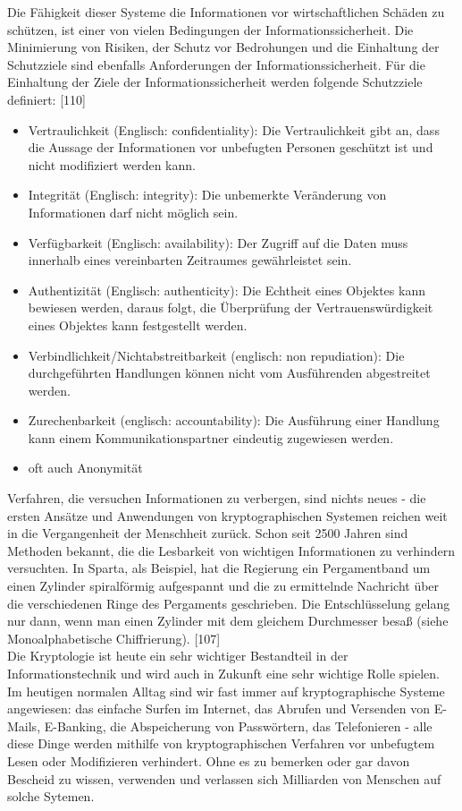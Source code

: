 \documentclass[12pt,a4paper]{report}
\begin{document}
\begin{onehalfspace}
Die Fähigkeit dieser Systeme die Informationen vor wirtschaftlichen Schäden zu schützen, ist einer von vielen Bedingungen der Informationssicherheit. Die Minimierung von Risiken, der Schutz vor Bedrohungen und die Einhaltung der Schutzziele sind ebenfalls Anforderungen der Informationssicherheit. Für die Einhaltung der Ziele der Informationssicherheit werden folgende Schutzziele definiert: [110]

\begin{itemize}
\item Vertraulichkeit (Englisch: confidentiality): Die Vertraulichkeit gibt an, dass die Aussage der Informationen vor unbefugten Personen geschützt ist und nicht modifiziert werden kann.
\item Integrität (Englisch: integrity): Die unbemerkte Veränderung von Informationen darf nicht möglich sein.
\item Verfügbarkeit (Englisch: availability): Der Zugriff auf die Daten muss innerhalb eines vereinbarten Zeitraumes gewährleistet sein.
\item Authentizität (Englisch: authenticity): Die Echtheit eines Objektes kann bewiesen werden, daraus folgt, die Überprüfung der Vertrauenswürdigkeit eines Objektes kann festgestellt werden.
\item Verbindlichkeit/Nichtabstreitbarkeit (englisch: non repudiation): Die durchgeführten Handlungen können nicht vom Ausführenden abgestreitet werden.
\item Zurechenbarkeit (englisch: accountability): Die Ausführung einer Handlung kann einem Kommunikationspartner eindeutig zugewiesen werden.
\item oft auch Anonymität
\end{itemize}

Verfahren, die versuchen Informationen zu verbergen, sind nichts neues - die ersten Ansätze und Anwendungen von kryptographischen Systemen reichen weit in die Vergangenheit der Menschheit zurück. Schon seit 2500 Jahren sind Methoden bekannt, die die Lesbarkeit von wichtigen Informationen zu verhindern versuchten. In Sparta, als Beispiel, hat die Regierung ein Pergamentband um einen Zylinder spiralförmig aufgespannt und die zu ermittelnde Nachricht über die verschiedenen Ringe des Pergaments geschrieben. Die Entschlüsselung gelang nur dann, wenn man einen Zylinder mit dem gleichem Durchmesser besaß (siehe Monoalphabetische Chiffrierung). [107]\\

Die Kryptologie ist heute ein sehr wichtiger Bestandteil in der Informationstechnik und wird auch in Zukunft eine sehr wichtige Rolle spielen. Im heutigen normalen Alltag sind wir fast immer auf kryptographische Systeme angewiesen: das einfache Surfen im Internet, das Abrufen und Versenden von E-Mails, E-Banking, die Abspeicherung von Passwörtern, das Telefonieren - alle diese Dinge werden mithilfe von kryptographischen Verfahren vor unbefugtem Lesen oder Modifizieren verhindert. Ohne es zu bemerken oder gar davon Bescheid zu wissen, verwenden und verlassen sich Milliarden von Menschen auf solche Sytemen.


\end{onehalfspace}
\end{document}
